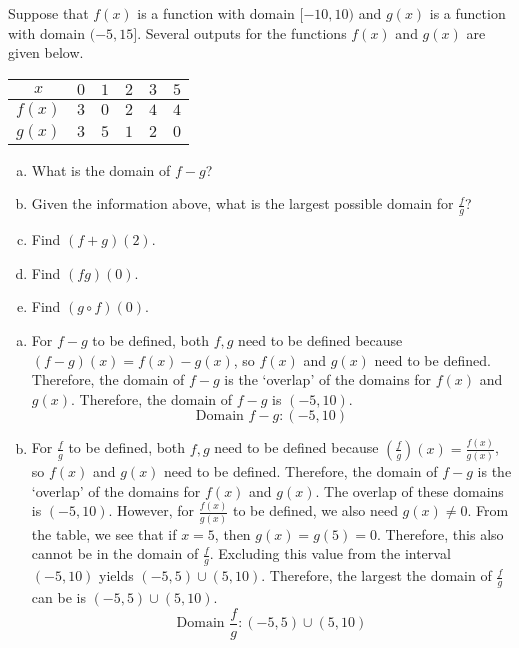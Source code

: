 \documentclass[12pt,letterpaper]{exam}
\begin{document}
\examtitle
{} 
\scores
\newpage

\begin{questions}

\newpage
\question[10] Suppose that $f(x)$ is a function with domain $[-10, 10)$ and $g(x)$ is a function with domain $(-5, 15]$. Several outputs for the functions $f(x)$ and $g(x)$ are given below. \par
	\begin{table}[!ht]
	\centering
	\begin{tabular}{|c||c|c|c|c|c|} \hline
	$x$ & $0$ & $1$ & $2$ & $3$ & $5$ \\ \hline \hline
	$f(x)$ & $3$ & $0$ & $2$ & $4$ & $4$ \\ \hline
	$g(x)$ & $3$ & $5$ & $1$ & $2$ & $0$ \\ \hline
	\end{tabular}
	\end{table} \par

\begin{enumerate}[(a)]
\item What is the domain of $f - g$?
\item Given the information above, what is the largest possible domain for $\frac{f}{g}$?
\item Find $(f + g)(2)$.
\item Find $(fg)(0)$.
\item Find $(g \circ f)(0)$.
\end{enumerate} \pspace

{\itshape
\begin{enumerate}[(a)]
\item For $f - g$ to be defined, both $f, g$ need to be defined because $(f - g)(x)= f(x) - g(x)$, so $f(x)$ and $g(x)$ need to be defined. Therefore, the domain of $f - g$ is the `overlap' of the domains for $f(x)$ and $g(x)$. Therefore, the domain of $f - g$ is $(-5, 10)$. 
	\[
	\text{Domain } f - g \colon (-5, 10)
	\]

\item For $\frac{f}{g}$ to be defined, both $f, g$ need to be defined because $\left( \frac{f}{g} \right)(x)= \frac{f(x)}{g(x)}$, so $f(x)$ and $g(x)$ need to be defined. Therefore, the domain of $f - g$ is the `overlap' of the domains for $f(x)$ and $g(x)$. The overlap of these domains is $(-5, 10)$. However, for $\frac{f(x)}{g(x)}$ to be defined, we also need $g(x) \neq 0$. From the table, we see that if $x= 5$, then $g(x)= g(5)= 0$. Therefore, this also cannot be in the domain of $\frac{f}{g}$. Excluding this value from the interval $(-5, 10)$ yields $(-5, 5) \cup (5, 10)$. Therefore, the largest the domain of $\frac{f}{g}$ can be is $(-5, 5) \cup (5, 10)$. 
	\[
	\text{Domain } \dfrac{f}{g} \colon (-5, 5) \cup (5, 10)
	\]


\end{enumerate}}
\end{questions}
\end{document}

